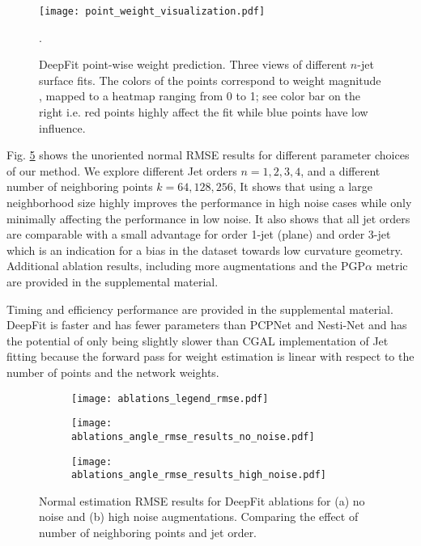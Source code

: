 \begin{figure}
\centering
	\texttt{[image: point\_weight\_visualization.pdf]}
	\caption{DeepFit point-wise weight prediction. Three views of different $n$-jet surface fits. The colors of the points correspond to weight magnitude , mapped to a heatmap ranging from 0 to 1; see color bar on the right i.e. red points highly affect the fit while blue points have low influence.}.
	\label{figure:results_weights_visualiztion}
\end{figure}

Fig. \ref{fig:results:ablation} shows the unoriented normal RMSE results for different parameter choices of our method. We explore different Jet orders $n=1, 2, 3, 4$, and a different number of neighboring points $k=64, 128, 256$, It shows that using a large neighborhood size highly improves the performance in high noise cases while only minimally affecting the performance in low noise. It also shows that all jet orders are comparable with a small advantage for order 1-jet (plane) and order 3-jet which is an indication for a bias in the dataset towards low curvature geometry. Additional ablation results, including more augmentations and the PGP$\alpha$ metric are provided in the supplemental material.

Timing and efficiency performance are provided in the supplemental material. DeepFit is faster and has fewer parameters than PCPNet and Nesti-Net and has the potential of only being slightly slower than CGAL implementation of Jet fitting because the forward pass for weight estimation is linear with respect to the number of points and the network weights.

\begin{figure}[t]
    \centering
    	\begin{subfigure}{.98\textwidth}
    \centering
\texttt{[image: ablations\_legend\_rmse.pdf]}
    	\label{fig:results:ablations:b}
	\end{subfigure}

    \begin{subfigure}{.49\textwidth}
        \centering
    	\texttt{[image: ablations\_angle\_rmse\_results\_no\_noise.pdf]}
    	\caption{}
        \label{fig:results:ablations:a}
    \end{subfigure}
	\begin{subfigure}{.49\textwidth}
    \centering
\texttt{[image: ablations\_angle\_rmse\_results\_high\_noise.pdf]}
    	\caption{}
    	\label{fig:results:ablations:b}
	\end{subfigure}
	    \caption{Normal estimation RMSE results for DeepFit ablations for (a) no noise and (b) high noise augmentations. Comparing the effect of number of neighboring points and jet order.}
    
    \label{fig:results:ablation}
\end{figure}

